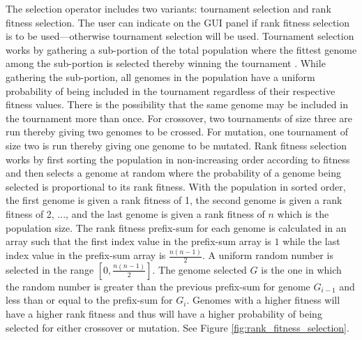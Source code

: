 The selection operator includes two variants: tournament selection and rank fitness selection. The user can indicate on the GUI panel if rank fitness selection is to be used---otherwise tournament selection will be used. Tournament selection works by gathering a sub-portion of the total population where the fittest genome among the sub-portion is selected thereby winning the tournament \cite{Miller95geneticalgorithms}. While gathering the sub-portion, all genomes in the population have a uniform probability of being included in the tournament regardless of their respective fitness values. There is the possibility that the same genome may be included in the tournament more than once. For crossover, two tournaments of size three are run thereby giving two genomes to be crossed. For mutation, one tournament of size two is run thereby giving one genome to be mutated. Rank fitness selection works by first sorting the population in non-increasing order according to fitness and then selects a genome at random where the probability of a genome being selected is proportional to its rank fitness. With the population in sorted order, the first genome is given a rank fitness of 1, the second genome is given a rank fitness of 2, ..., and the last genome is given a rank fitness of $n$ which is the population size. The rank fitness prefix-sum for each genome is calculated in an array such that the first index value in the prefix-sum array is $1$ while the last index value in the prefix-sum array is $\frac{n(n-1)}{2}$. A uniform random number is selected in the range $\left[0,\frac{n(n-1)}{2}\right]$. The genome selected $G$ is the one in which the random number is greater than the previous prefix-sum for genome $G_{i-1}$ and less than or equal to the prefix-sum for $G_i$. Genomes with a higher fitness will have a higher rank fitness and thus will have a higher probability of being selected for either crossover or mutation. See Figure \ref{fig:rank_fitness_selection}. 

\renewcommand{\baselinestretch}{1.0}

